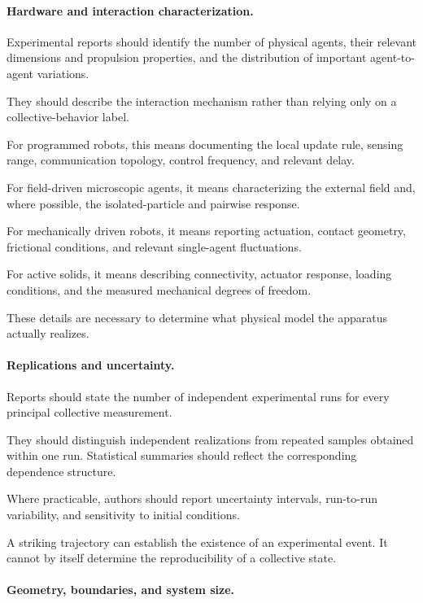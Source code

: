 \paragraph*{Hardware and interaction characterization.}

Experimental reports should identify the
number of physical agents,
their relevant dimensions and
propulsion properties,
and the distribution of
important agent-to-agent
variations.

They should describe the interaction
mechanism rather than relying
only on a collective-behavior label.

For programmed robots, this means
documenting the local update rule,
sensing range, communication topology,
control frequency, and relevant delay.

For field-driven microscopic agents,
it means characterizing the external
field and, where possible,
the isolated-particle and
pairwise response.

For mechanically driven robots,
it means reporting actuation,
contact geometry, frictional
conditions, and relevant
single-agent fluctuations.

For active solids, it means
describing connectivity,
actuator response,
loading conditions,
and the measured
mechanical degrees of freedom.

These details are necessary
to determine what physical
model the apparatus
actually realizes.

\paragraph*{Replications and uncertainty.}

Reports should state the number
of independent experimental runs
for every principal collective
measurement.

They should distinguish independent
realizations from repeated samples
obtained within one run.
Statistical summaries should reflect
the corresponding dependence
structure.

Where practicable, authors should
report uncertainty intervals,
run-to-run variability,
and sensitivity to
initial conditions.

A striking trajectory
can establish the existence
of an experimental event.
It cannot by itself determine
the reproducibility of a
collective state.

\paragraph*{Geometry, boundaries, and system size.}

